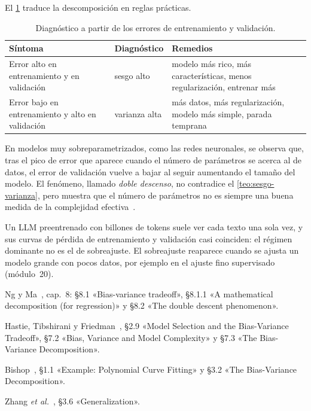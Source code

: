 El \cref{tab:diagnostico} traduce la descomposición en reglas prácticas.

\begin{table}[h]
\centering\small
\caption{Diagnóstico a partir de los errores de entrenamiento y validación.}\label{tab:diagnostico}
\begin{tabular}{@{}>{\raggedright\arraybackslash}p{}>{\raggedright\arraybackslash}p{}>{\raggedright\arraybackslash}p{}@{}}
\toprule
Síntoma & Diagnóstico & Remedios \\
\midrule
Error alto en entrenamiento y en validación & sesgo alto & modelo más rico, más características, menos regularización, entrenar más \\
Error bajo en entrenamiento y alto en validación & varianza alta & más datos, más regularización, modelo más simple, parada temprana \\
\bottomrule
\end{tabular}
\end{table}

\begin{observacion}
En modelos muy sobreparametrizados, como las redes neuronales, se observa que, tras el pico de error que aparece cuando el número de parámetros se acerca al de datos, el error de validación vuelve a bajar al seguir aumentando el tamaño del modelo. El fenómeno, llamado \emph{doble descenso}, no contradice el \cref{teo:sesgo-varianza}, pero muestra que el número de parámetros no es siempre una buena medida de la complejidad efectiva~\cite[§8.2]{cs229}.
\end{observacion}

\begin{observacion}
Un LLM preentrenado con billones de tokens suele ver cada texto una sola vez, y sus curvas de pérdida de entrenamiento y validación casi coinciden: el régimen dominante no es el de sobreajuste. El sobreajuste reaparece cuando se ajusta un modelo grande con pocos datos, por ejemplo en el ajuste fino supervisado (módulo~20).
\end{observacion}

\begin{lecturas}
\item Ng y Ma~\cite{cs229}, cap.~8: §8.1 «Bias-variance tradeoff», §8.1.1 «A mathematical decomposition (for regression)» y §8.2 «The double descent phenomenon».
\item Hastie, Tibshirani y Friedman~\cite{esl}, §2.9 «Model Selection and the Bias-Variance Tradeoff», §7.2 «Bias, Variance and Model Complexity» y §7.3 «The Bias-Variance Decomposition».
\item Bishop~\cite{bishop}, §1.1 «Example: Polynomial Curve Fitting» y §3.2 «The Bias-Variance Decomposition».
\item Zhang \emph{et al.}~\cite{d2l}, §3.6 «Generalization».
\end{lecturas}

